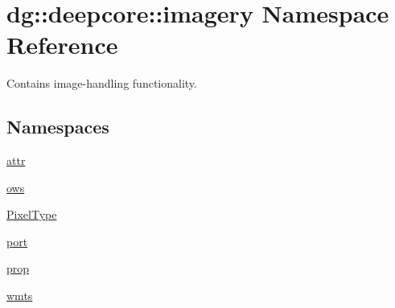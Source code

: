 \hypertarget{namespacedg_1_1deepcore_1_1imagery}{}\section{dg\+:\+:deepcore\+:\+:imagery Namespace Reference}
\label{namespacedg_1_1deepcore_1_1imagery}


Contains image-\/handling functionality.  


\subsection*{Namespaces}
\begin{DoxyCompactItemize}
\item 
 \hyperlink{namespacedg_1_1deepcore_1_1imagery_1_1attr}{attr}
\item 
 \hyperlink{namespacedg_1_1deepcore_1_1imagery_1_1ows}{ows}
\item 
 \hyperlink{namespacedg_1_1deepcore_1_1imagery_1_1_pixel_type}{Pixel\+Type}
\item 
 \hyperlink{namespacedg_1_1deepcore_1_1imagery_1_1port}{port}
\item 
 \hyperlink{namespacedg_1_1deepcore_1_1imagery_1_1prop}{prop}
\item 
 \hyperlink{namespacedg_1_1deepcore_1_1imagery_1_1wmts}{wmts}
\end{DoxyCompactItemize}
